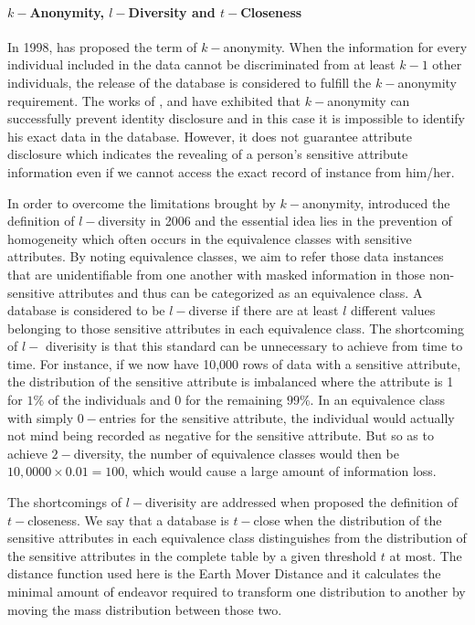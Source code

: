 \paragraph{$k-$Anonymity, $l-$Diversity and $t-$Closeness}
In 1998, \citet{sweeney2002k} has proposed the term of $k-$anonymity. When the information for every individual included in the data
cannot be discriminated from at least $k-1$ other individuals, the release of the database is considered to fulfill the
$k-$anonymity requirement. The works of \citet{machanavajjhala2007diversity}, \citet{truta2006privacy} and \citet{xiao2006personalized} have exhibited that $k-$anonymity can successfully prevent identity disclosure and in this case it is impossible to identify his exact data in the database. However, it does not guarantee attribute disclosure which indicates the revealing of a person's sensitive attribute information even if we cannot access the exact record of instance from him/her. 

In order to overcome the limitations brought by $k-$anonymity, \citet{machanavajjhala2007diversity} introduced the definition of $l-$diversity in 2006 and the
essential idea lies in the prevention of homogeneity which often occurs in the equivalence classes with sensitive attributes.
By noting equivalence classes, we aim to refer those data instances that are unidentifiable from one another with masked information
in those non-sensitive attributes and thus can be categorized as an equivalence class. A database is considered to be $l-$diverse
if there are at least $l$ different values belonging to those sensitive attributes in each equivalence class. The shortcoming of $l-$ diverisity
is that this standard can be unnecessary to achieve from time to time. For instance, if we now have 10,000 rows of data with a sensitive attribute,
the distribution of the sensitive attribute is imbalanced where the attribute is 1 for $1\%$ of the individuals and 0 for the remaining
$99\%$. In an equivalence class with simply $0-$entries for the sensitive attribute, the individual would actually not mind being
recorded as negative for the sensitive attribute. But so as to achieve $2-$diversity, the number of equivalence classes would
then be $10,0000 \times 0.01 = 100$, which would cause a large amount of information loss.

The shortcomings of $l-$diverisity are addressed when \citet{xiao2006personalized} proposed the definition of $t-$closeness. We say that a database
is $t-$close when the distribution of the sensitive attributes in each equivalence class distinguishes from the distribution of the sensitive attributes 
in the complete table by a given threshold $t$ at most. The distance function used here is the Earth Mover Distance \citep{rubner2000earth} and it
calculates the minimal amount of endeavor required to transform one distribution to another by moving the mass distribution between those two.


